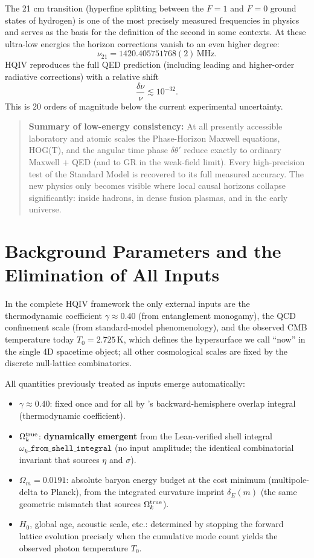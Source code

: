 \documentclass[12pt,a4paper]{article}
\begin{document}
The 21 cm transition (hyperfine splitting between the \(F=1\) and \(F=0\) ground states of hydrogen) is one of the most precisely measured frequencies in physics and serves as the basis for the definition of the second in some contexts. At these ultra-low energies the horizon corrections vanish to an even higher degree:
\[
\nu_{21} = 1420.405751768(2)\,\text{MHz}.
\]
HQIV reproduces the full QED prediction (including leading and higher-order radiative corrections) with a relative shift
\[
\frac{\delta\nu}{\nu} \lesssim 10^{-32}.
\]
This is 20 orders of magnitude below the current experimental uncertainty.

\begin{quote}
{\bfseries Summary of low-energy consistency:} At all presently accessible laboratory and atomic scales the Phase-Horizon Maxwell equations, HOG(T), and the angular time phase \(\delta\theta'\) reduce exactly to ordinary Maxwell + QED (and to GR in the weak-field limit). Every high-precision test of the Standard Model is recovered to its full measured accuracy. The new physics only becomes visible where local causal horizons collapse significantly: inside hadrons, in dense fusion plasmas, and in the early universe.
\end{quote}

\section{Background Parameters and the Elimination of All Inputs}

In the complete HQIV framework the only external inputs are the thermodynamic coefficient $\gamma \approx 0.40$ (from entanglement monogamy), the QCD confinement scale (from standard-model phenomenology), and the observed CMB temperature today $T_0 = 2.725$\,K, which defines the hypersurface we call ``now'' in the single 4D spacetime object; all other cosmological scales are fixed by the discrete null-lattice combinatorics.

All quantities previously treated as inputs emerge automatically:

\begin{itemize}
    \item $\gamma \approx 0.40$: fixed once and for all by \citet{brodie2026}'s backward-hemisphere overlap integral (thermodynamic coefficient).
    \item \(\Omega_k^{\rm true}\): \textbf{dynamically emergent} from the Lean-verified shell integral \(\omega_k\texttt{\_from\_shell\_integral}\) \citep{hqiv-lean} (no input amplitude; the identical combinatorial invariant that sources \(\eta\) and \(\sigma\)).
    \item $\Omega_m = 0.0191$: absolute baryon energy budget at the cost minimum (multipole-delta to Planck), from the integrated curvature imprint $\delta_E(m)$ (the same geometric mismatch that sources \(\Omega_k^{\rm true}\)).
    \item $H_0$, global age, acoustic scale, etc.: determined by stopping the forward lattice evolution precisely when the cumulative mode count yields the observed photon temperature $T_0$.
\end{itemize}
\end{document}
